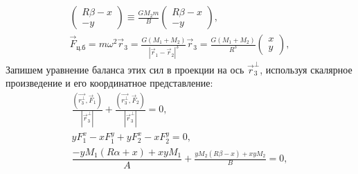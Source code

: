 {{\begin{gather*}
\begin{pmatrix}
			R\beta - x\\
			-y
	\end{pmatrix} \equiv \frac{G M_2 m}{B}\begin{pmatrix}
			R\beta - x\\
			-y
	\end{pmatrix},\\
	\vec{F}_\text{ц.б} = m\omega^2 \vec{r}_3 = \frac{G (M_1 + M_2)}{|\vec{r}_1 - \vec{r}_2|^3} \vec{r}_3 = \frac{G(M_1 + M_2)}{R^3} \begin{pmatrix}
			x\\
			y
	\end{pmatrix},
\end{gather*}
Запишем уравнение баланса этих сил в проекции на ось $\vec{r}_3^\perp$, используя скалярное произведение и его координатное представление:
	\begin{gather*}
		\frac{ \left( \vec{r_3^\perp},  \vec{F}_1 \right)}{\left| \vec{r}_3^\perp \right|} + \frac{ \left( \vec{r_3^\perp}, \vec{F}_2 \right)}{\left| \vec{r}_3^\perp \right|} = 0,\\
		y F_1^x - x F_1^y + y F_2^x - x F_2^y = 0,\\
	\dfrac{-y M_1 (R\alpha + x ) + x y M_1}{A} 	+ \frac{y M_2(R\beta - x) + xy  M_2}{B}= 0,\\

\end{gather*}}}
